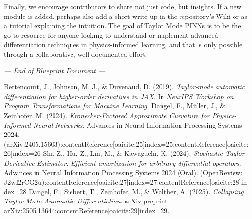 \documentclass[11pt]{article}
\begin{document}
Finally, we encourage contributors to share not just code, but insights. If a new module is added, perhaps also add a short write-up in the repository's Wiki or as a tutorial explaining the intuition. The goal of Taylor Mode PINNs is to be the go-to resource for anyone looking to understand or implement advanced differentiation techniques in physics-informed learning, and that is only possible through a collaborative, well-documented effort.

\vfill
\begin{center}
\textit{--- End of Blueprint Document ---}
\end{center}

\begin{thebibliography}{99}
 Bettencourt, J., Johnson, M. J., \& Duvenaud, D. (2019). \textit{Taylor-mode automatic differentiation for higher-order derivatives in JAX}. In \textit{NeurIPS Workshop on Program Transformations for Machine Learning}.
 Dangel, F., M{\"u}ller, J., \& Zeinhofer, M. (2024). \textit{Kronecker-Factored Approximate Curvature for Physics-Informed Neural Networks}. Advances in Neural Information Processing Systems 2024. (arXiv:2405.15603):contentReference[oaicite:25]{index=25}:contentReference[oaicite:26]{index=26}
 Shi, Z., Hu, Z., Lin, M., \& Kawaguchi, K. (2024). \textit{Stochastic Taylor Derivative Estimator: Efficient amortization for arbitrary differential operators}. Advances in Neural Information Processing Systems 2024 (Oral). (OpenReview: J2wI2rCG2u):contentReference[oaicite:27]{index=27}:contentReference[oaicite:28]{index=28}
 Dangel, F., Siebert, T., Zeinhofer, M., \& Walther, A. (2025). \textit{Collapsing Taylor Mode Automatic Differentiation}. arXiv preprint arXiv:2505.13644:contentReference[oaicite:29]{index=29}.
\end{thebibliography}
\end{document}

